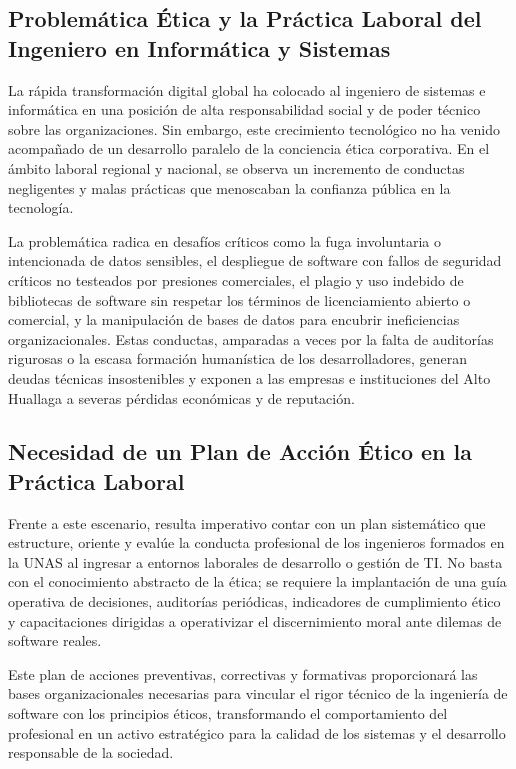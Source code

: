 \documentclass[12pt,a4paper]{article}
\begin{document}
\subsection{Problemática Ética y la Práctica Laboral del Ingeniero en Informática y Sistemas}
La rápida transformación digital global ha colocado al ingeniero de sistemas e informática en una posición de alta responsabilidad social y de poder técnico sobre las organizaciones. Sin embargo, este crecimiento tecnológico no ha venido acompañado de un desarrollo paralelo de la conciencia ética corporativa. En el ámbito laboral regional y nacional, se observa un incremento de conductas negligentes y malas prácticas que menoscaban la confianza pública en la tecnología.

La problemática radica en desafíos críticos como la fuga involuntaria o intencionada de datos sensibles, el despliegue de software con fallos de seguridad críticos no testeados por presiones comerciales, el plagio y uso indebido de bibliotecas de software sin respetar los términos de licenciamiento abierto o comercial, y la manipulación de bases de datos para encubrir ineficiencias organizacionales. Estas conductas, amparadas a veces por la falta de auditorías rigurosas o la escasa formación humanística de los desarrolladores, generan deudas técnicas insostenibles y exponen a las empresas e instituciones del Alto Huallaga a severas pérdidas económicas y de reputación.

\subsection{Necesidad de un Plan de Acción Ético en la Práctica Laboral}
Frente a este escenario, resulta imperativo contar con un plan sistemático que estructure, oriente y evalúe la conducta profesional de los ingenieros formados en la UNAS al ingresar a entornos laborales de desarrollo o gestión de TI. No basta con el conocimiento abstracto de la ética; se requiere la implantación de una guía operativa de decisiones, auditorías periódicas, indicadores de cumplimiento ético y capacitaciones dirigidas a operativizar el discernimiento moral ante dilemas de software reales.

Este plan de acciones preventivas, correctivas y formativas proporcionará las bases organizacionales necesarias para vincular el rigor técnico de la ingeniería de software con los principios éticos, transformando el comportamiento del profesional en un activo estratégico para la calidad de los sistemas y el desarrollo responsable de la sociedad.
\end{document}
